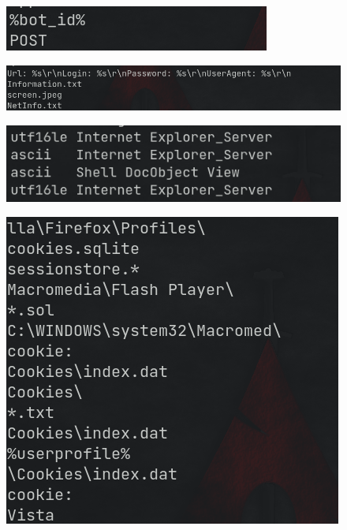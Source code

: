 \documentclass[10pt,a4paper]{article}
\begin{document}
	\begin{figure}[!htbp]%
		\centering
		\includegraphics[width=\columnwidth]{pics/sus5.png}
	\end{figure}
	\begin{figure}[!htbp]%
		\centering
		\includegraphics[width=\columnwidth]{pics/sus6.png}
	\end{figure}
	\begin{figure}[!htbp]%
		\centering
		\includegraphics[width=\columnwidth]{pics/sus7.png}
	\end{figure}
	\begin{figure}[!htbp]%
		\centering
		\includegraphics[width=\columnwidth]{pics/sus8.png}
	\end{figure}
\end{document}

